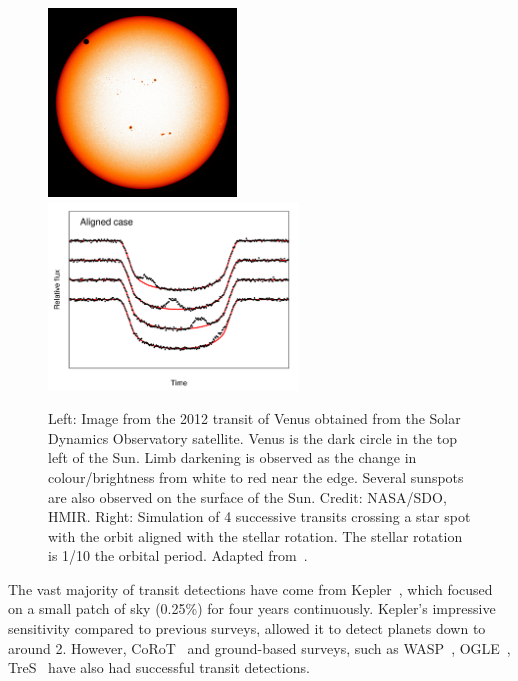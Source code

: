 \begin{figure}
    \centering
    \includegraphics[height=5cm]{./figures/introduction/SDO_2012_Venus_Transit.jpg}
    \includegraphics[height=5cm]{figures/introduction/sanchisojedafig1-crop.pdf}
    \caption[Transit of Venus and successive transit corssings.]{Left: Image from the 2012 transit of Venus obtained from the Solar Dynamics Observatory satellite.
    Venus is the dark circle in the top left of the Sun.
    Limb darkening is observed as the change in colour/brightness from white to red near the edge.
    Several sunspots are also observed on the surface of the Sun.
    Credit: {NASA}/{SDO}, {HMIR}.
    Right: Simulation of 4 successive transits crossing a star spot with the orbit aligned with the stellar rotation.
    The stellar rotation is 1/10 the orbital period.
    Adapted from~\citet[][Figure~1]{sanchis-ojeda_starspots_2013}.}
    \label{fig:transit_venus_transit_alignment}
\end{figure}


The vast majority of transit detections have come from Kepler~\citep{borucki_characteristics_2011}, which focused on a small patch of sky (0.25\%) for four years continuously.
Kepler's impressive sensitivity compared to previous surveys, allowed it to detect planets down to around 2\Rearth{}.
However, {CoRoT}~\citep{barge_transiting_2008} and ground-based surveys, such as WASP~\citep{pollacco_wasp_2006}, OGLE~\citep{udalski_optical_2002}, TreS~\citep{alonso_tres1_2004} have also had successful transit detections.


